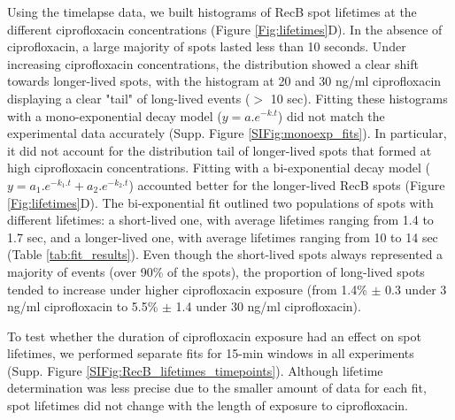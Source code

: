 Using the timelapse data, we built histograms of RecB spot lifetimes at the different ciprofloxacin concentrations (Figure \ref{Fig:lifetimes}D). In the absence of ciprofloxacin, a large majority of spots lasted less than 10 seconds. Under increasing ciprofloxacin concentrations, the distribution showed a clear shift towards longer-lived spots, with the histogram at 20 and 30 ng/ml ciprofloxacin displaying a clear "tail" of long-lived events ($>$ 10 sec). Fitting these histograms with a mono-exponential decay model ($y = a.e^{-k.t}$) did not match the experimental data accurately (Supp. Figure \ref{SIFig:monoexp_fits}). In particular, it did not account for the distribution tail of longer-lived spots that formed at high ciprofloxacin concentrations. Fitting with a bi-exponential decay model ($y = a_1.e^{-k_1.t} + a_2.e^{-k_2.t}$) accounted better for the longer-lived RecB spots (Figure \ref{Fig:lifetimes}D). The bi-exponential fit outlined two populations of spots with different lifetimes: a short-lived one, with average lifetimes ranging from 1.4 to 1.7 sec, and a longer-lived one, with average lifetimes ranging from 10 to 14 sec (Table \ref{tab:fit_results}). Even though the short-lived spots always represented a majority of events (over 90\% of the spots), the proportion of long-lived spots tended to increase under higher ciprofloxacin exposure (from 1.4\% $\pm$ 0.3 under 3 ng/ml ciprofloxacin to 5.5\% $\pm$ 1.4 under 30 ng/ml ciprofloxacin).

To test whether the duration of ciprofloxacin exposure had an effect on spot lifetimes, we performed separate fits for 15-min windows in all experiments (Supp. Figure \ref{SIFig:RecB_lifetimes_timepoints}). Although lifetime determination was less precise due to the smaller amount of data for each fit, spot lifetimes did not change with the length of exposure to ciprofloxacin.

